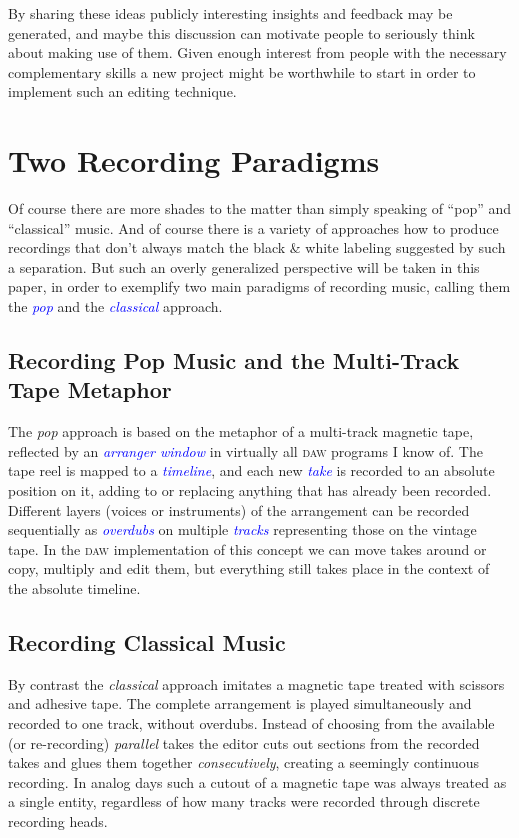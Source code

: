 \documentclass[11pt,a4paper]{article}
\newcommand*{\term}[1]{\textcolor{blue}{\emph{#1}}}
\begin{document}
By sharing these ideas publicly interesting insights and
feedback may be generated, and maybe this discussion can motivate people to seriously
think about making use of them.
Given enough interest from people with the necessary complementary skills a new project
might be worthwhile to start in order to implement such an editing technique.

\section{Two Recording Paradigms}

Of course there are more shades to the matter than simply speaking of “pop” and
“classical” music.
And of course there is a variety of approaches how to produce recordings that
don't always match the black \& white labeling suggested by such a separation.
But such an overly generalized perspective will be taken in this paper, in order
to exemplify two main paradigms of recording music, calling them the \term{pop}
and the \term{classical} approach.

\subsection{Recording Pop Music and the Multi-Track Tape Metaphor}

The \emph{pop} approach is based on the metaphor of a multi-track magnetic tape,
reflected by an \term{arranger window} in virtually all \textsc{daw} programs I
know of.
The tape reel is mapped to a \term{timeline}, and each new \term{take} is recorded to
an absolute position on it, adding to or replacing anything that has already
been recorded.
Different layers (voices or instruments) of the arrangement can be recorded
sequentially as \term{overdubs} on multiple \term{tracks} representing those on the
vintage tape.
In the \textsc{daw} implementation of this concept we can move takes around or copy,
multiply and edit them, but everything still takes place in the context of the
absolute timeline.

\subsection{Recording Classical Music}
 
By contrast the \emph{classical} approach imitates a magnetic tape
treated with scissors and adhesive tape.
The complete arrangement is played simultaneously and recorded to one track,
without overdubs.
Instead of choosing from the available (or re-recording) \emph{parallel} takes
the editor cuts out sections from the recorded takes and glues them together
\emph{consecutively}, creating a seemingly continuous recording.
In analog days such a cutout of a magnetic tape was always treated as a single entity,
regardless of how many tracks were recorded through discrete recording heads.
\end{document}
